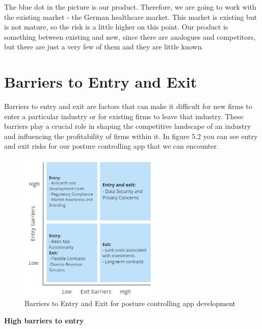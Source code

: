 The blue dot in the picture is our product. Therefore, we are going to work with the existing market - the German healthcare market. This market is existing but is not mature, so the risk is a little higher on this point. Our product is something between existing and new, since there are analogues and competitors, but there are just a very few of them and they are little known.

\section{Barriers to Entry and Exit}

Barriers to entry and exit are factors that can make it difficult for new firms to enter a particular industry or for existing firms to leave that industry. These barriers play a crucial role in shaping the competitive landscape of an industry and influencing the profitability of firms within it. In figure 5.2 you can see entry and exit risks for our posture controlling app that we can encounter. 

\begin{figure}[H]
	\centering
	\includegraphics[width=0.6\textwidth]{figures/barriers_to_entry_and_exit.png}
	\caption{Barriers to Entry and Exit for posture controlling app development}
	\label{fig:performance_tree_fs}
\end{figure}

\textbf{High barriers to entry}

